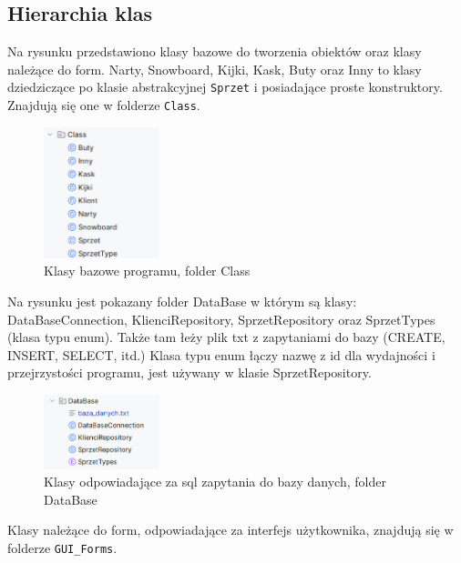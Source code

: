 \subsection{Hierarchia klas}
Na rysunku przedstawiono klasy bazowe do tworzenia obiektów oraz klasy należące do form.
\newline
Narty, Snowboard, Kijki, Kask, Buty oraz Inny to klasy dziedziczące po klasie abstrakcyjnej \texttt{Sprzet} i posiadające proste konstruktory. Znajdują się one w folderze \texttt{Class}.
\begin{figure}[h]
    \centering
    \includegraphics[width=0.3\textwidth]{figures/klasy_bazowe.jpg}
    \caption{Klasy bazowe programu, folder Class}
\end{figure} 
\newline
Na rysunku jest pokazany folder DataBase w którym są klasy: DataBaseConnection, KlienciRepository, SprzetRepository oraz SprzetTypes (klasa typu enum). Także tam łeży plik txt z zapytaniami do bazy (CREATE, INSERT, SELECT, itd.)
Klasa typu enum łączy nazwę z id dla wydajności i przejrzystości programu, jest używany w klasie SprzetRepository.
\begin{figure}[h]
    \centering
    \includegraphics[width=0.3\textwidth]{figures/klasy_db.jpg}
    \caption{Klasy odpowiadające za sql zapytania do bazy danych, folder DataBase}
\end{figure} 
\newline
Klasy należące do form, odpowiadające za interfejs użytkownika, znajdują się w folderze \texttt{GUI\_Forms}.
